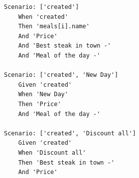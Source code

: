 \label{eval:scenarios_meal}
\begin{lstlisting}
Scenario: ['created']
	When 'created'
	Then 'meals[i].name'
	And 'Price'
	And 'Best steak in town -'
	And 'Meal of the day -'

Scenario: ['created', 'New Day']
	Given 'created'
	When 'New Day'
	Then 'Price'
	And 'Meal of the day -'

Scenario: ['created', 'Discount all']
	Given 'created'
	When 'Discount all'
	Then 'Best steak in town -'
	And 'Price'
\end{lstlisting}




